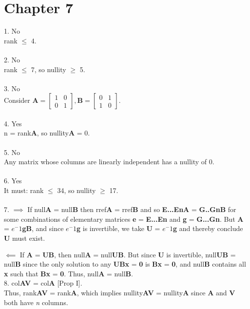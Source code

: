 \documentclass{article}
\begin{document}
    \section*{Chapter 7}
    \setlength{\parindent}{0pt}
    1. No \\
    rank $\le$ 4. \\
    \\
    2. No \\
    rank $\le$ 7, so nullity $\ge$ 5. \\
    \\
    3. No \\
    Consider $\textbf{A} = \begin{bmatrix} 1 & 0\\ 0 & 1\end{bmatrix}, \textbf{B} = \begin{bmatrix} 0 & 1\\ 1 & 0\end{bmatrix}$. \\
    \\
    4. Yes \\
    n = rank\textbf{A}, so nullity\textbf{A} = 0. \\
    \\
    5. No \\
    Any matrix whose columns are linearly independent has a nullity of 0. \\
    \\
    6. Yes \\
    It must: rank $\le$ 34, so nullity $\ge$ 17. \\
    \\
    7. $\implies$ If null\textbf{A} = null\textbf{B} then rref\textbf{A} = rref\textbf{B} and so \textbf{E...EnA} = \textbf{G..GnB} for some combinations of elementary matrices \textbf{e} = \textbf{E...En} and \textbf{g} = \textbf{G...Gn}. But \textbf{A} = \textbf{$e^-1$gB}, and since \textbf{$e^-1$g} is invertible, we take \textbf{U} = \textbf{$e^-1$g} and thereby conclude \textbf{U} must exist.

  $\impliedby$ If \textbf{A} = \textbf{UB}, then null\textbf{A} = null\textbf{UB}. But since \textbf{U} is invertible, null\textbf{UB} = null\textbf{B} since the only solution to any \textbf{UBx} = \textbf{0} is \textbf{Bx} = \textbf{0}, and null\textbf{B} contains all \textbf{x} such that \textbf{Bx} = \textbf{0}. Thus, null\textbf{A} = null\textbf{B}. \\

    8. col\textbf{AV} = col\textbf{A} [Prop I].\\
    Thus, rank\textbf{AV} = rank\textbf{A}, which implies nullity\textbf{AV} = nullity\textbf{A} since \textbf{A} and \textbf{V} both have \textit{n} columns. \\
\end{document}
